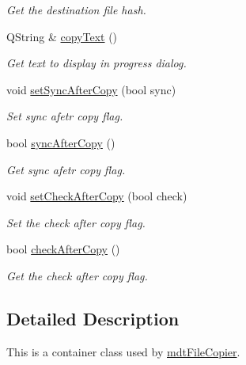\begin{DoxyCompactItemize}
\begin{DoxyCompactList}\small\item\em Get the destination file hash. \end{DoxyCompactList}\item 
\hypertarget{classmdt_file_copier_item_aee819f575bd9f0d060f12da3194ce2ae}{
QString \& \hyperlink{classmdt_file_copier_item_aee819f575bd9f0d060f12da3194ce2ae}{copyText} ()}
\label{classmdt_file_copier_item_aee819f575bd9f0d060f12da3194ce2ae}

\begin{DoxyCompactList}\small\item\em Get text to display in progress dialog. \end{DoxyCompactList}\item 
void \hyperlink{classmdt_file_copier_item_a141b6cc40264a590781497c83d84bc65}{setSyncAfterCopy} (bool sync)
\begin{DoxyCompactList}\small\item\em Set sync afetr copy flag. \end{DoxyCompactList}\item 
bool \hyperlink{classmdt_file_copier_item_a82827e5a959e9fb9b437552fe80fa7a6}{syncAfterCopy} ()
\begin{DoxyCompactList}\small\item\em Get sync afetr copy flag. \end{DoxyCompactList}\item 
void \hyperlink{classmdt_file_copier_item_a196f41dd9ac0d71dd33b5bcf6d9737fa}{setCheckAfterCopy} (bool check)
\begin{DoxyCompactList}\small\item\em Set the check after copy flag. \end{DoxyCompactList}\item 
bool \hyperlink{classmdt_file_copier_item_af18508003d547b6d35e26964311ae0ed}{checkAfterCopy} ()
\begin{DoxyCompactList}\small\item\em Get the check after copy flag. \end{DoxyCompactList}\end{DoxyCompactItemize}


\subsection{Detailed Description}
This is a container class used by \hyperlink{classmdt_file_copier}{mdtFileCopier}. 

